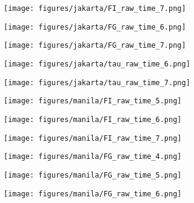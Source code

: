 \documentclass[a4paper]{article}
\def\lthtmlcheckvsize{\ifdim\ht\sizebox<\vsize 
  \ifdim\wd\sizebox<\hsize\expandafter\hfill\fi \expandafter\vfill
  \else\expandafter\vss\fi}%
\begin{document}
{\newpage\clearpage
{}%
\texttt{[image: figures/jakarta/FI\_raw\_time\_7.png]}%
\lthtmlpictureZ
\lthtmlcheckvsize\clearpage}

{\newpage\clearpage
{}%
\texttt{[image: figures/jakarta/FG\_raw\_time\_6.png]}%
\lthtmlpictureZ
\lthtmlcheckvsize\clearpage}

{\newpage\clearpage
{}%
\texttt{[image: figures/jakarta/FG\_raw\_time\_7.png]}%
\lthtmlpictureZ
\lthtmlcheckvsize\clearpage}

{\newpage\clearpage
{}%
\texttt{[image: figures/jakarta/tau\_raw\_time\_6.png]}%
\lthtmlpictureZ
\lthtmlcheckvsize\clearpage}

{\newpage\clearpage
{}%
\texttt{[image: figures/jakarta/tau\_raw\_time\_7.png]}%
\lthtmlpictureZ
\lthtmlcheckvsize\clearpage}

{\newpage\clearpage
{}%
\texttt{[image: figures/manila/FI\_raw\_time\_5.png]}%
\lthtmlpictureZ
\lthtmlcheckvsize\clearpage}

{\newpage\clearpage
{}%
\texttt{[image: figures/manila/FI\_raw\_time\_6.png]}%
\lthtmlpictureZ
\lthtmlcheckvsize\clearpage}

{\newpage\clearpage
{}%
\texttt{[image: figures/manila/FI\_raw\_time\_7.png]}%
\lthtmlpictureZ
\lthtmlcheckvsize\clearpage}

{\newpage\clearpage
{}%
\texttt{[image: figures/manila/FG\_raw\_time\_4.png]}%
\lthtmlpictureZ
\lthtmlcheckvsize\clearpage}

{\newpage\clearpage
{}%
\texttt{[image: figures/manila/FG\_raw\_time\_5.png]}%
\lthtmlpictureZ
\lthtmlcheckvsize\clearpage}

{\newpage\clearpage
{}%
\texttt{[image: figures/manila/FG\_raw\_time\_6.png]}%
\lthtmlpictureZ
\lthtmlcheckvsize\clearpage}
\end{document}
